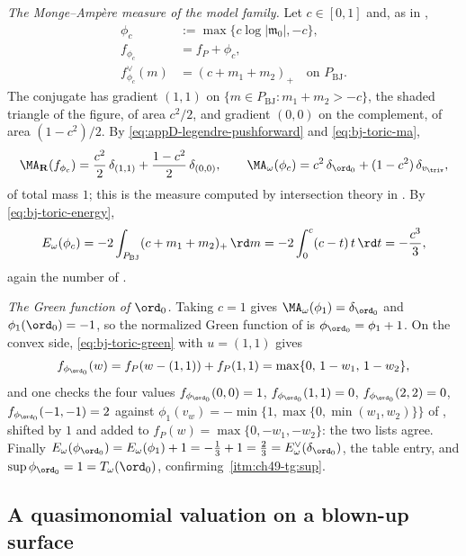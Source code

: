 \begin{example}
\emph{The Monge--Amp\`ere measure of the model family.}  Let
$c\in[0,1]$ and, as in ,
\[
 \begin{aligned}
  \phi_c&:=\max\{c\log|\mathfrak m_0|,-c\},\\
  f_{\phi_c}&=f_P+\phi_c,\\
  f^\vee_{\phi_c}(m)&=(c+m_1+m_2)_+
    \quad\text{on }P_{\mathrm{BJ}}.
 \end{aligned}
\]
The conjugate has gradient $(1,1)$ on
$\{m\in P_{\mathrm{BJ}}:m_1+m_2>-c\}$, the shaded triangle of the figure,
of area $c^2/2$, and gradient $(0,0)$ on the complement, of area
$(1-c^2)/2$.  By \eqref{eq:appD-legendre-pushforward} and
\eqref{eq:bj-toric-ma},
\[
 \MA_{\mathbf R}(f_{\phi_c})
 =\frac{c^2}2\,\delta_{(1,1)}+\frac{1-c^2}2\,\delta_{(0,0)},
 \qquad
 \MA_\omega(\phi_c)
 =c^2\,\delta_{\ord_0}+(1-c^2)\,\delta_{v_{\triv}} ,
\]
of total mass $1$; this is the measure computed by intersection theory in
.  By \eqref{eq:bj-toric-energy},
\[
 E_\omega(\phi_c)
 =-2\int_{P_{\mathrm{BJ}}}(c+m_1+m_2)_+\,\rd m
 =-2\int_0^c(c-t)\,t\,\rd t=-\frac{c^3}3 ,
\]
again the number of .

\emph{The Green function of $\ord_0$.}  Taking $c=1$ gives
$\MA_\omega(\phi_1)=\delta_{\ord_0}$ and
$\phi_1(\ord_0)=-1$, so the normalized Green function of
 is $\phi_{\ord_0}=\phi_1+1$.  On the convex
side, \eqref{eq:bj-toric-green} with $u=(1,1)$ gives
\[
 f_{\phi_{\ord_0}}(w)=f_P(w-(1,1))+f_P(1,1)
 =\max\{0,\,1-w_1,\,1-w_2\},
\]
and one checks the four values
$f_{\phi_{\ord_0}}(0,0)=1$,
$f_{\phi_{\ord_0}}(1,1)=0$,
$f_{\phi_{\ord_0}}(2,2)=0$,
$f_{\phi_{\ord_0}}(-1,-1)=2$ against
$\phi_1(v_w)=-\min\{1,\max\{0,\min(w_1,w_2)\}\}$ of
, shifted by $1$ and added to
$f_P(w)=\max\{0,-w_1,-w_2\}$: the two lists agree.  Finally
$E_\omega(\phi_{\ord_0})=E_\omega(\phi_1)+1=-\tfrac13+1=\tfrac23
=E^\vee_\omega(\delta_{\ord_0})$, the table entry, and
$\sup\phi_{\ord_0}=1=T_\omega(\ord_0)$, confirming
\,\cref{itm:ch49-tg:sup}.
\end{example}

\subsection{A quasimonomial valuation on a blown-up surface}
\label{sec:ch49-blowup}

